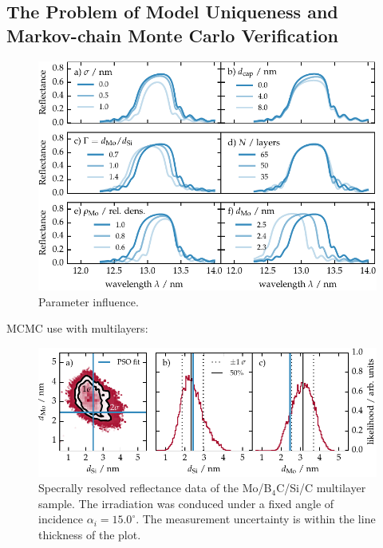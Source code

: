 \subsection{The Problem of Model Uniqueness and Markov-chain Monte Carlo Verification}
\begin{figure}[htbp]
\centering
\includegraphics{img/parameter_influence}
\caption{Parameter influence.}
\label{ch_spec:fig_mo_si_parameter_influence}
\end{figure}

MCMC use with multilayers: \cite{hobson_markov-chain_2004}
\begin{figure}[htbp]
\centering
\includegraphics{img/PTB17_MCMC_d_Mo_vs_d_Si}
\caption{Specrally resolved reflectance data of the Mo/B$_4$C/Si/C multilayer sample. The irradiation was conduced under a fixed angle of incidence $\alpha_i = 15.0^\circ$. The measurement uncertainty is within the line thickness of the plot.}
\label{ch_spec:fig_ptb17_MCMC_d_Mo_vs_d_Si}
\end{figure}

